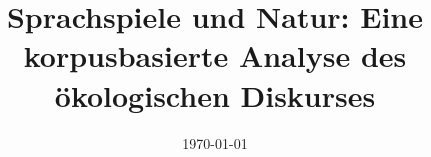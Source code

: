 \documentclass[a4paper, 11pt, twoside]{Thesis}  %
\begin{document}
\frontmatter      %

\title  {Sprachspiele und Natur: Eine korpusbasierte Analyse des \"{o}kologischen Diskurses}
\addresses  {\groupname\\\deptname\\\univname}  %
\date       {\today}
\subject    {}
\keywords   {}

\maketitle


\fancyhead{}  %
\rhead{\thepage}  %
\lhead{}  %

\pagestyle{fancy}  %
\end{document}
